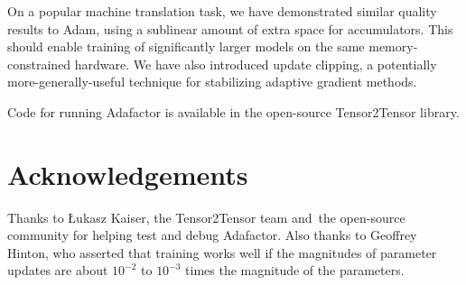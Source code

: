 \documentclass{article}
\begin{document}
On a popular machine translation task, we have demonstrated similar quality results to Adam, using a sublinear amount of extra space for accumulators.  This should enable training of significantly larger models on the same memory-constrained hardware.  We have also introduced update clipping, a potentially more-generally-useful technique for stabilizing adaptive gradient methods.

Code for running Adafactor is available in the open-source Tensor2Tensor library.

\section*{Acknowledgements}  Thanks to \L{}ukasz Kaiser, the Tensor2Tensor team and~the open-source community for helping test and debug Adafactor.  Also thanks to Geoffrey Hinton, who asserted that training works well if the magnitudes of parameter updates are about $10^{-2}$ to $10^{-3}$ times the magnitude of the parameters.



\end{document}
